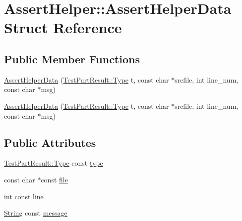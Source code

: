 \hypertarget{structtesting_1_1internal_1_1AssertHelper_1_1AssertHelperData}{\section{\-Assert\-Helper\-:\-:\-Assert\-Helper\-Data \-Struct \-Reference}
\label{da/d69/structtesting_1_1internal_1_1AssertHelper_1_1AssertHelperData}
}
\subsection*{\-Public \-Member \-Functions}
\begin{DoxyCompactItemize}
\item 
\hyperlink{structtesting_1_1internal_1_1AssertHelper_1_1AssertHelperData_aa9297ff3be7e875e1cba3e44e0cbc536}{\-Assert\-Helper\-Data} (\hyperlink{classtesting_1_1TestPartResult_a1d1cfd8ffb84e947f82999c682b666a7}{\-Test\-Part\-Result\-::\-Type} t, const char $\ast$srcfile, int line\-\_\-num, const char $\ast$msg)
\item 
\hyperlink{structtesting_1_1internal_1_1AssertHelper_1_1AssertHelperData_aa9297ff3be7e875e1cba3e44e0cbc536}{\-Assert\-Helper\-Data} (\hyperlink{classtesting_1_1TestPartResult_a1d1cfd8ffb84e947f82999c682b666a7}{\-Test\-Part\-Result\-::\-Type} t, const char $\ast$srcfile, int line\-\_\-num, const char $\ast$msg)
\end{DoxyCompactItemize}
\subsection*{\-Public \-Attributes}
\begin{DoxyCompactItemize}
\item 
\hyperlink{classtesting_1_1TestPartResult_a1d1cfd8ffb84e947f82999c682b666a7}{\-Test\-Part\-Result\-::\-Type} const \hyperlink{structtesting_1_1internal_1_1AssertHelper_1_1AssertHelperData_a411db9f4276ebb3fa7c47dd0ed5488ec}{type}
\item 
const char $\ast$const \hyperlink{structtesting_1_1internal_1_1AssertHelper_1_1AssertHelperData_aec64e701957578ef33343a1d705f9ecd}{file}
\item 
int const \hyperlink{structtesting_1_1internal_1_1AssertHelper_1_1AssertHelperData_ad42b220b1bf90b42fe461c4201c064a5}{line}
\item 
\hyperlink{classtesting_1_1internal_1_1String}{\-String} const \hyperlink{structtesting_1_1internal_1_1AssertHelper_1_1AssertHelperData_ad7d3cf03eb90f4520fac971afce980b6}{message}
\end{DoxyCompactItemize}
